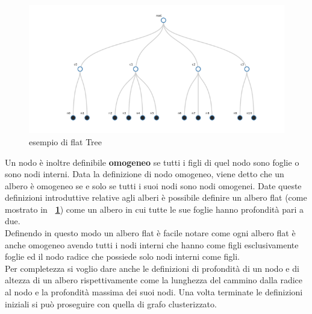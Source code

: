 {\begin{figure}[!htb]
	\begin{center}
		\includegraphics[width=0.8 \linewidth]{figure/flatTree}
	\end{center}
	\caption{esempio di flat Tree \label{fig:flatTree}}
\end{figure}
Un nodo è inoltre definibile \textbf{omogeneo} se tutti i figli di quel nodo sono foglie o sono nodi interni.
Data la definizione di nodo omogeneo, viene detto che un albero è omogeneo se e solo se tutti i suoi nodi sono nodi omogenei.
Date queste definizioni introduttive relative agli alberi è possibile definire un albero flat (come mostrato in \textbf{\figurename~\ref{fig:flatTree}}) come un albero in cui tutte le sue foglie hanno profondità pari a due.\\
Definendo in questo modo un albero flat è facile notare come ogni albero flat è anche omogeneo avendo tutti i nodi interni che hanno come figli esclusivamente foglie ed il nodo radice che possiede solo nodi interni come figli.\\
Per completezza si voglio dare anche le definizioni di profondità di un nodo e di altezza di un albero rispettivamente come la lunghezza del cammino dalla radice al nodo e la profondità massima dei suoi nodi.
Una volta terminate le definizioni iniziali si può proseguire con quella di grafo clusterizzato.
}
